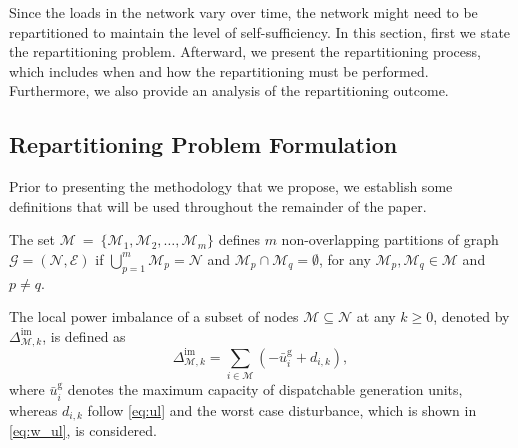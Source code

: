 Since the loads in the network vary over time, the network might need to be repartitioned to maintain the level of self-sufficiency. In this section, first we state the repartitioning problem. Afterward, we present the repartitioning process, which includes when and how the repartitioning must be performed. Furthermore, we also provide an analysis of the  repartitioning outcome.

\subsection{Repartitioning Problem Formulation}
Prior to presenting the methodology that we propose, we establish some definitions that will be used throughout the remainder of the paper. 

\begin{defn}
	\label{def:nop}
	The set $\boldsymbol{\mathcal{M}}~=~\{\mathcal{M}_1, \mathcal{M}_2, \dots, \mathcal{M}_m \}$ defines $m$ non-overlapping partitions of graph $\mathcal{G}=(\mathcal{N},\mathcal{E})$ if $\bigcup_{p=1}^m \mathcal{M}_p = \mathcal{N}$ and $\mathcal{M}_p \cap \mathcal{M}_q = \emptyset$, for any $\mathcal{M}_p,\mathcal{M}_q \in \boldsymbol{\mathcal{M}}$ and $p \neq q$. %
\end{defn}

\begin{defn}
	The local power imbalance of a subset of nodes $\mathcal{M}\subseteq\mathcal{N}$ at any $k\geq0$, denoted by $\Delta_{\mathcal{M},k}^{\mathrm{im}}$, is defined as
	\begin{equation}
		\Delta_{\mathcal{M},k}^{\mathrm{im}}= \sum_{i \in \mathcal{M}} \left(-\bar{u}_{i}^{\mathrm{g}} + {d}_{i,k}\right),
		\label{eq:p_im}
	\end{equation}
	where $\bar{u}_{i}^{\mathrm{g}}$ denotes the maximum capacity of dispatchable generation units, whereas ${d}_{i,k}$ follow \eqref{eq:ul} and the worst case disturbance, which is shown in \eqref{eq:w_ul}, is considered. \eod
	\label{def:local_imb}
\end{defn} 

